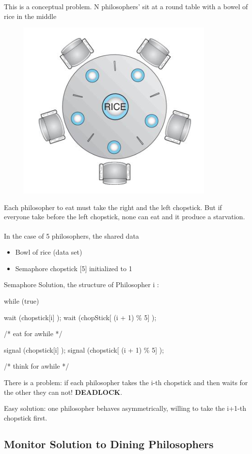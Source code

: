 This is a conceptual problem. N philosophers’ sit at a round table with a bowel of rice in the middle

\begin{figure}[htbp]
    \centering
    \includegraphics[width=0.3\linewidth]{img/phil.png}
\end{figure}

Each philosopher to eat must take the right and the left chopstick. But if everyone take before the left chopstick, none can eat and it produce a starvation.
\paragraph{}
In the case of 5 philosophers, the shared data
\begin{itemize}
    \item Bowl of rice (data set)
    \item Semaphore chopstick [5] initialized to 1
\end{itemize}

Semaphore Solution, the structure of Philosopher i :

\begin{codeInC}
while (true){
    wait (chopstick[i] );
    wait (chopStick[ (i + 1) \% 5] );
    
        /* eat for awhile */
        
    signal (chopstick[i] );
    signal (chopstick[ (i + 1) \% 5] );
    
        /* think for awhile */
}
\end{codeInC}

There is a problem: if each philosopher takes the i-th chopstick and then waits
for the other they can not! \textbf{DEADLOCK}.

Easy solution: one philosopher behaves asymmetrically, willing
to take the i+1-th chopstick first.

\newpage
\subsection{Monitor Solution to Dining Philosophers}


